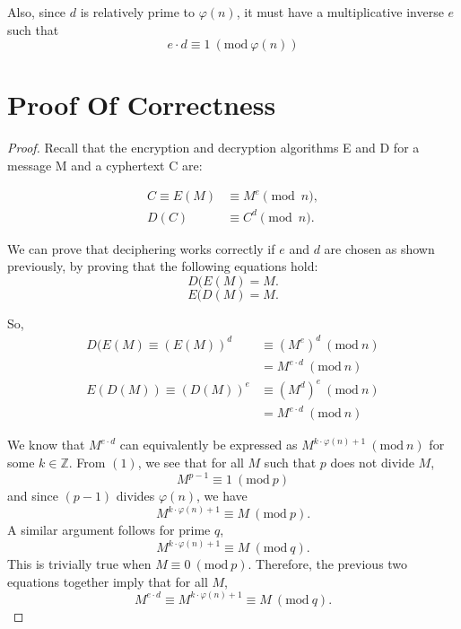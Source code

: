 \documentclass[12pt]{article}
\newcommand{\Mod}[1]{\ (\text{mod}\ #1)}
\begin{document}
\begin{multicols}{2}
Also, since $d$ is relatively prime to $\varphi(n)$, it must have a multiplicative inverse $e$ such that
\begin{equation} \label{eq:3}
e\cdot d \equiv 1 \Mod{\varphi(n)} 
\end{equation}

\maketitle
\section*{Proof Of Correctness}
\begin{proof}
Recall that the encryption and decryption algorithms E and D for a message M and a cyphertext C are:

\begin{align}
C \equiv E(M) &\equiv M^e \pmod{n}, \nonumber\\
D(C) &\equiv C^d \pmod{n}. \nonumber
\end{align}

We can prove that deciphering works correctly if $e$ and $d$ are chosen as shown previously, by proving that the following equations hold:
\begin{equation} \label{eq:4}
D(E(M) = M.
\end{equation}
\begin{equation} \label{eq:5}
E(D(M) = M. 
\end{equation}

So,
\begin{align*}
D(E(M) \equiv (E(M))^d &\equiv (M^e)^d\Mod {n} \\
&=M^{e\cdot d} \Mod{n} \\
E(D(M)) \equiv (D(M))^e &\equiv (M^d)^e\Mod {n} \\
&=M^{e\cdot d} \Mod{n}
\end{align*}

We know that $M^{e\cdot d} $ can equivalently be expressed as $M^{k\cdot\varphi(n)+1}\Mod{n}$ for some $k\in \mathbb{Z}$. 
From $(1)$, we see that for all $M$ such that $p$ does not divide $M$,
$$M^{p-1} \equiv 1 \Mod{p} $$
and since $(p - 1)$ divides $\varphi(n)$, we have
$$ M^{k\cdot\varphi(n)+1} \equiv M \Mod{p}.$$
A similar argument follows for prime $q$,
$$ M^{k\cdot\varphi(n)+1} \equiv M \Mod{q} .$$
This is trivially true when $M \equiv 0 \Mod{p}.$ Therefore, the previous two equations together imply that for all $M$,
$$M^{e\cdot d} \equiv M^{k\cdot\varphi(n)+1} \equiv M \Mod{q} .$$


\end{proof}
\end{multicols}
\end{document}
